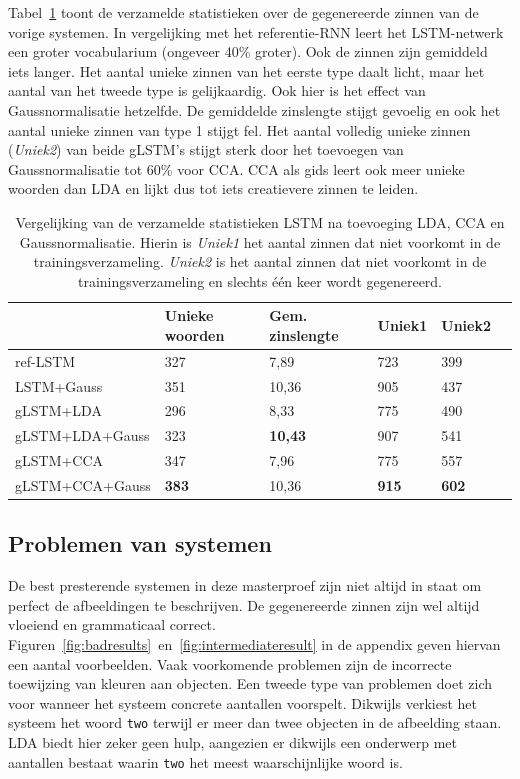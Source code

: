 Tabel~\ref{table:lstm_stats} toont de verzamelde statistieken over de gegenereerde zinnen van de vorige systemen. In vergelijking met het referentie-RNN leert het LSTM-netwerk een groter vocabularium (ongeveer 40\% groter). Ook de zinnen zijn gemiddeld iets langer. Het aantal unieke zinnen van het eerste type daalt licht, maar het aantal van het tweede type is gelijkaardig.
Ook hier is het effect van Gaussnormalisatie hetzelfde. De gemiddelde zinslengte stijgt gevoelig en ook het aantal unieke zinnen van type 1 stijgt fel. Het aantal volledig unieke zinnen (\emph{Uniek2}) van beide gLSTM's stijgt sterk door het toevoegen van Gaussnormalisatie tot 60\% voor CCA. CCA als gids leert ook meer unieke woorden dan LDA en lijkt dus tot iets creatievere zinnen te leiden.
    \begin{table}
    	\centering
    	\begin{tabular}{llllll}
    		~                   & Unieke woorden & Gem. zinslengte & Uniek1 & Uniek2 \\ \hline
    		ref-LSTM         				  & 327   & 7,89   & 723   & 399  \\
    		LSTM+Gauss        				  & 351   & 10,36   & 905   & 437  \\
    		gLSTM+LDA         				  & 296   & 8,33   & 775   & 490     \\
    		gLSTM+LDA+Gauss 				  & 323   & \textbf{10,43}   & 907   & 541     \\
    		gLSTM+CCA         				  & 347   & 7,96   & 775   &557   \\
    		gLSTM+CCA+Gauss 				  & \textbf{383}   & 10,36   & \textbf{915}   & \textbf{602}    \\\hline
    	\end{tabular}
	\caption[Vergelijking van de verzamelde statistieken LSTM na toevoeging LDA, CCA en Gaussnormalisatie]{Vergelijking van de verzamelde statistieken LSTM na toevoeging LDA, CCA en Gaussnormalisatie. Hierin is \emph{Uniek1} het aantal zinnen dat niet voorkomt in de trainingsverzameling. \emph{Uniek2} is het aantal zinnen dat niet voorkomt in de trainingsverzameling en slechts \'e\'en keer wordt gegenereerd.}
    	\label{table:lstm_stats}
    \end{table}
    
\subsection{Problemen van systemen}
De best presterende systemen in deze masterproef zijn niet altijd in staat om perfect de afbeeldingen te beschrijven.
 De gegenereerde zinnen zijn wel altijd vloeiend en grammaticaal correct.
  Figuren~\ref{fig:badresults}~en~\ref{fig:intermediateresult} in de appendix geven hiervan een aantal voorbeelden.
Vaak voorkomende problemen zijn de incorrecte toewijzing van kleuren aan objecten.
Een tweede type van problemen doet zich voor wanneer het systeem concrete aantallen voorspelt.
Dikwijls verkiest het systeem het woord \texttt{two} terwijl er meer dan twee objecten in de afbeelding staan.
LDA biedt hier zeker geen hulp, aangezien er dikwijls een onderwerp met aantallen bestaat waarin \texttt{two} het meest waarschijnlijke woord is.


